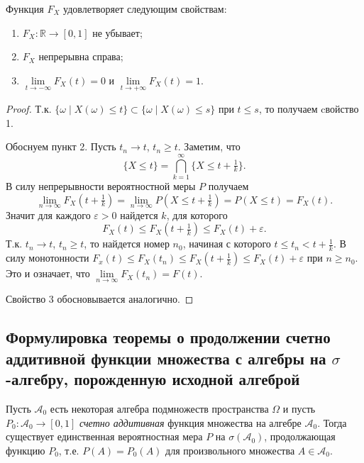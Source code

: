 \begin{proposal*}
    Функция $F_X$ удовлетворяет следующим свойствам:
    \begin{enumerate}
        \item $F_X\colon \mathbb{R}\to [0, 1]$ не убывает;
        \item $F_X$ непрерывна справа;
        \item $\lim\limits_{t \to -\infty} F_X(t) = 0$ и $\lim\limits_{t \to +\infty} F_X(t) = 1$.
    \end{enumerate}
\end{proposal*}

\begin{proof}
    Т.к. $\{\omega \mid X(\omega) \leqslant t\} \subset \{\omega \mid X(\omega) \leqslant s\}$ при $t \leqslant s$, то получаем cвойство 1.

    \noindent Обоснуем пункт 2.
    Пусть $t_n \to t$, $t_n \geqslant t$.
    Заметим, что
    \[
        \{X \leqslant t\} = \bigcap\limits_{k = 1}^\infty\{X \leqslant t + \tfrac{1}{k}\}.
    \]
    В силу непрерывности вероятностной меры $P$ получаем
    \[
        \lim_{n \to \infty}F_X(t + \tfrac{1}{k}) = \lim_{n \to \infty}P(X \leqslant t + \tfrac{1}{k}) = P(X \leqslant t) = F_X(t).
    \]
    Значит для каждого $\varepsilon > 0$ найдется $k$, для которого
    \[
        F_X(t) \leqslant F_X(t + \tfrac{1}{k}) \leqslant F_X(t) + \varepsilon.
    \]
    Т.к. $t_n \to t$, $t_n \geqslant t$, то найдется номер $n_0$, начиная с которого $t \leqslant t_n < t + \frac{1}{k}$.
    В силу монотонности $F_x(t) \leqslant F_X(t_n) \leqslant F_X(t + \frac{1}{k}) \leqslant F_X(t) + \varepsilon$
    при $n\geqslant n_0$.
    Это и означает, что $\lim\limits_{n \to \infty}F_X(t_n) = F(t)$.

    Свойство 3 обосновывается аналогично.
\end{proof}

\sectionbreak
\subsection{Формулировка теоремы о продолжении счетно аддитивной функции множества с алгебры на $\sigma$-алгебру, порожденную исходной алгеброй}

\begin{theorem}[б/д]
    Пусть $\mathcal{A}_0$ есть некоторая алгебра подмножеств пространства $\Omega$ и пусть $P_0 \colon \mathcal{A}_0 \to [0, 1]$ {\it счетно аддитивная} функция множества на алгебре $\mathcal{A}_0$.
    Тогда существует единственная вероятностная мера $P$ на $\sigma(\mathcal{A}_0)$, продолжающая функцию $P_0$, т.е. $P(A) = P_0(A)$ для произвольного множества $A\in\mathcal{A}_0$.
\end{theorem}

